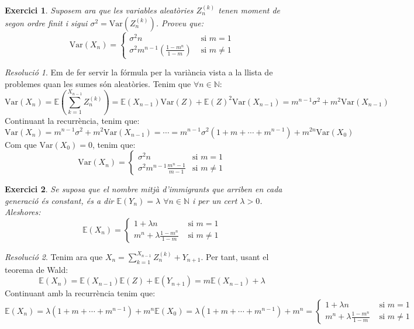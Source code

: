 \documentclass[10pt,a4paper]{article}
\newcommand{\NN}{\ensuremath{\mathbb{N}}} %
\newcommand{\Exp}{\mathbb{E}} %
\newcommand{\Var}{\mathrm{Var}} %
\newtheorem{exercici}{Exercici}
\theoremstyle{definition}
\theoremstyle{remark}
\newtheorem{res}{Resolució}
\begin{document}
\begin{exercici}
  Suposem ara que les variables aleatòries $Z_n^{(k)}$ tenen moment de segon ordre finit i sigui $\sigma^2=\Var(Z_n^{(k)})$. Proveu que:
  $$\Var(X_n)=
    \begin{cases}
      \sigma^2 n                                    & \text{ si $m=1$}    \\
      \sigma^2m^{n-1}\left(\frac{1-m^n}{1-m}\right) & \text{ si $m\ne 1$}
    \end{cases}
  $$
\end{exercici}
\begin{res}
  Em de fer servir la fórmula per la variància vista a la llista de problemes quan les sumes són aleatòries. Tenim que $\forall n\in\NN$:
  $$\Var(X_n)=\Exp\left(\sum_{k=1}^{X_{n-1}}Z_n^{(k)}\right)=\Exp(X_{n-1})\Var(Z)+{\Exp(Z)}^2\Var(X_{n-1})=m^{n-1}\sigma^2+m^2\Var(X_{n-1})$$
  Continuant la recurrència, tenim que:
  $$\Var(X_n)=m^{n-1}\sigma^2+m^2\Var(X_{n-1})=\cdots=m^{n-1}\sigma^2(1+m+\cdots+m^{n-1})+m^{2n}\Var(X_0)$$
  Com que $\Var(X_0)=0$, tenim que:
  $$
    \Var(X_n)=
    \begin{cases}
      \sigma^2n                        & \text{si $m=1$}    \\
      \sigma^2m^{n-1}\frac{m^n-1}{m-1} & \text{si $m\ne 1$}
    \end{cases}
  $$
\end{res}
\begin{exercici}
  Se suposa que el nombre mitjà d'immigrants que arriben en cada generació és constant, és a dir $\Exp(Y_n)=\lambda$ $\forall n\in\NN$ i per un cert $\lambda>0$. Aleshores:
  $$
    \Exp(X_n)=
    \begin{cases}
      1+ \lambda n                 & \text{ si $m=1$}    \\
      m^n+\lambda\frac{1-m^n}{1-m} & \text{ si $m\ne 1$}
    \end{cases}
  $$
\end{exercici}
\begin{res}
  Tenim ara que $X_n=\sum_{k=1}^{X_{n-1}}Z_n^{(k)}+Y_{n+1}$. Per tant, usant el teorema de Wald:
  $$\Exp\left(X_n\right)=\Exp(X_{n-1})\Exp(Z)+\Exp(Y_{n+1})=m\Exp(X_{n-1})+\lambda$$
  Continuant amb la recurrència tenim que:
  $$\Exp\left(X_n\right)=\lambda(1+m+\cdots+m^{n-1})+m^n\Exp(X_0)=\lambda(1+m+\cdots+m^{n-1})+m^n=
    \begin{cases}
      1+ \lambda n                 & \text{ si $m=1$}    \\
      m^n+\lambda\frac{1-m^n}{1-m} & \text{ si $m\ne 1$}
    \end{cases}$$

\end{res}
\end{document}
